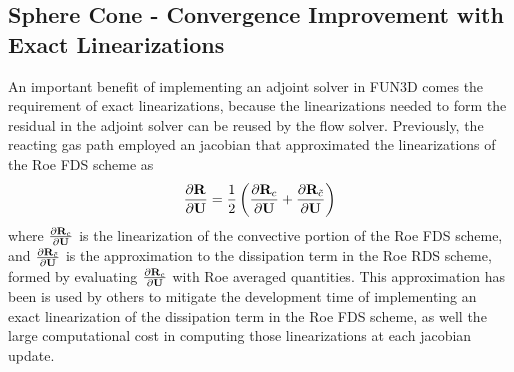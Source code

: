 \subsection{Sphere Cone - Convergence Improvement with Exact Linearizations}

An important benefit of implementing an adjoint solver in FUN3D comes the
requirement of exact linearizations, because the linearizations needed to form
the residual in the adjoint solver can be reused by the flow solver.
Previously, the reacting gas path employed an jacobian that approximated the
linearizations of the Roe FDS scheme\cite{gnoffo-tp} as
\begin{equation}
  \frac{\partial \mathbf R_{}}{\partial \mathbf U} = 
  \frac{1}{2} \left( \frac{\partial \mathbf R_{c}}{\partial \mathbf U} + \frac{\partial \mathbf R_{\tilde{c}}}{\partial \mathbf U} \right)
  \label{approx-roe-jac}
\end{equation}
where $\frac{\partial \mathbf R_{c}}{\partial \mathbf U}$ is the linearization of the convective portion of the Roe
FDS scheme, and $\frac{\partial \mathbf R_{\tilde{c}}}{\partial \mathbf U}$ is the approximation to the dissipation
term in the Roe RDS scheme, formed by evaluating $\frac{\partial \mathbf R_{c}}{\partial \mathbf U}$ with Roe
averaged quantities.  This approximation has been is used by others
\cite{rinaldi2014exact} to mitigate the development time of implementing an
exact linearization of the dissipation term in the Roe FDS scheme, as well the
large computational cost in computing those linearizations at each jacobian
update.


